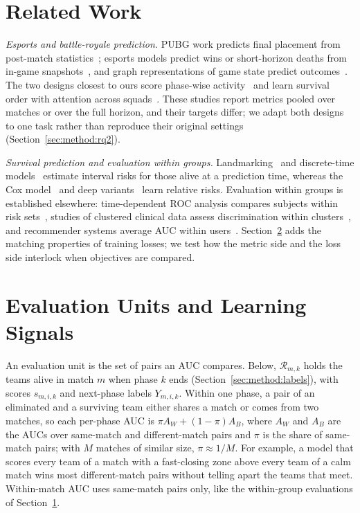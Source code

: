 \documentclass[sigconf,anonymous,nonacm]{acmart}
\begin{document}
\section{Related Work}
\label{sec:related}
\emph{Esports and battle-royale prediction.} PUBG work predicts final placement from post-match statistics~\cite{KagglePUBG,LeeLee25}; esports models predict wins or short-horizon deaths from in-game snapshots~\cite{Hodge21,Katona19,Marshall22}, and graph representations of game state predict outcomes~\cite{Xenopoulos21}. The two designs closest to ours score phase-wise activity~\cite{Sagong25a} and learn survival order with attention across squads~\cite{KRAFTON}. These studies report metrics pooled over matches or over the full horizon, and their targets differ; we adapt both designs to one task rather than reproduce their original settings (Section~\ref{sec:method:rq2}).

\emph{Survival prediction and evaluation within groups.} Landmarking~\cite{vanHouwelingen07} and discrete-time models~\cite{SingerWillett93,Gensheimer19} estimate interval risks for those alive at a prediction time, whereas the Cox model~\cite{Cox72} and deep variants~\cite{DeepHit18,DynamicDeepHit20} learn relative risks. Evaluation within groups is established elsewhere: time-dependent ROC analysis compares subjects within risk sets~\cite{HeagertyZheng05}, studies of clustered clinical data assess discrimination within clusters~\cite{vanKlaveren14}, and recommender systems average AUC within users~\cite{Zhou18}. Section~\ref{sec:account} adds the matching properties of training losses; we test how the metric side and the loss side interlock when objectives are compared.

\section{Evaluation Units and Learning Signals}
\label{sec:account}
An evaluation unit is the set of pairs an AUC compares. Below, $\mathcal{R}_{m,k}$ holds the teams alive in match $m$ when phase $k$ ends (Section~\ref{sec:method:labels}), with scores $s_{m,i,k}$ and next-phase labels $Y_{m,i,k}$. Within one phase, a pair of an eliminated and a surviving team either shares a match or comes from two matches, so each per-phase AUC is $\pi A_W+(1-\pi)A_B$, where $A_W$ and $A_B$ are the AUCs over same-match and different-match pairs and $\pi$ is the share of same-match pairs; with $M$ matches of similar size, $\pi\approx1/M$. For example, a model that scores every team of a match with a fast-closing zone above every team of a calm match wins most different-match pairs without telling apart the teams that meet. Within-match AUC uses same-match pairs only, like the within-group evaluations of Section~\ref{sec:related}.
\end{document}
